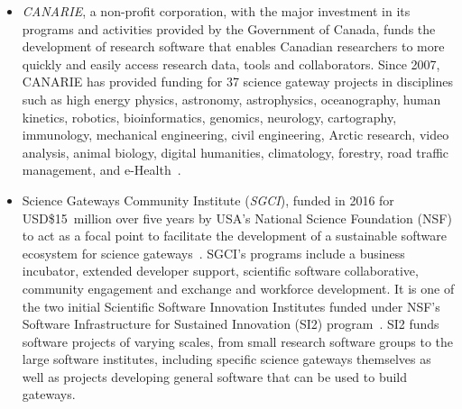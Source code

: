 \documentclass[review]{elsarticle}
\begin{document}
\begin{itemize}

\item \emph{CANARIE}, a non-profit corporation, with the major investment in its programs and activities provided by the Government of Canada, funds the development of research software that enables Canadian researchers to more quickly and easily access research data, tools and collaborators. Since 2007, CANARIE has provided funding for 37 science gateway projects in disciplines such as high energy physics, astronomy, astrophysics, oceanography, human kinetics, robotics, bioinformatics, genomics, neurology, cartography, immunology, mechanical engineering, civil engineering, Arctic research, video analysis, animal biology, digital humanities, climatology, forestry, road traffic management, and e-Health~\cite{canarie-15}. 

\item Science Gateways Community Institute (\emph{SGCI}), funded in 2016 for \mbox{USD\$15 million} over five years by USA's National Science Foundation (NSF) to act as a focal point to facilitate the development of a sustainable software ecosystem for science gateways~\cite{sgci-16}. SGCI's programs include a business incubator, extended developer support, scientific software collaborative, community engagement and exchange and workforce development. It is one of the two initial Scientific Software Innovation Institutes funded under NSF's Software Infrastructure for Sustained Innovation (SI2) program~\cite{nsf-si-17}. SI2 funds software projects of varying scales, from small research software groups to the large software institutes, including specific science gateways themselves as well as projects developing general software that can be used to build gateways. 


\end{itemize}
\end{document}
